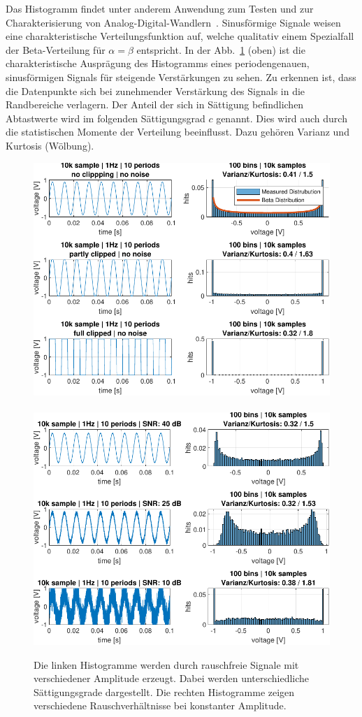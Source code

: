 Das Histogramm findet unter anderem Anwendung zum Testen und zur Charakterisierung von Analog-Digital-Wandlern~\cite{Gamad-2009}. Sinusförmige Signale weisen eine charakteristische Verteilungsfunktion auf, welche qualitativ einem Spezialfall der Beta-Verteilung für $\alpha = \beta$ entspricht. In der Abb.~\ref{fig:Histogramm-Gain} (oben) ist die charakteristische Ausprägung des Histogramms eines periodengenauen, sinusförmigen Signals für steigende Verstärkungen zu sehen. Zu erkennen ist, dass die Datenpunkte sich bei zunehmender Verstärkung des Signals in die Randbereiche verlagern. Der Anteil der sich in Sättigung befindlichen Abtastwerte wird im folgenden Sättigungsgrad $c$ genannt. Dies wird auch durch die statistischen Momente der Verteilung beeinflusst. Dazu gehören Varianz und Kurtosis (Wölbung).
\begin{figure}[h!] 
	\hspace*{-2mm}
	\centering 
	\includegraphics[width=1.05\columnwidth]{../img/beta-distribution.pdf}~~~~~
	\includegraphics[width=1.05\columnwidth]{../img/noise-histogramm.pdf}
	\caption{Die linken Histogramme werden durch rauschfreie Signale mit verschiedener Amplitude erzeugt. Dabei werden unterschiedliche Sättigungsgrade dargestellt. Die rechten Histogramme zeigen verschiedene Rauschverhältnisse bei konstanter Amplitude.}
	\label{fig:Histogramm-Gain}
\end{figure} 
